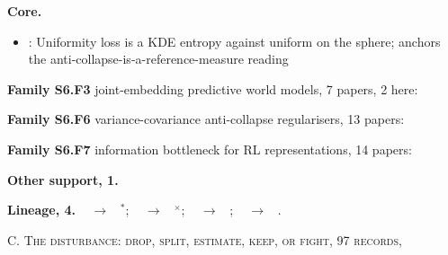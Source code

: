 \documentclass[10pt]{article}
\newcommand{\memb}[1]{\par\smallskip\textbf{#1}\quad}
\begin{document}
\memb{Core.}
\begin{itemize}[nosep,leftmargin=1.2em]
\item \citet{Wang-understanding20}: Uniformity loss is a KDE entropy against uniform on the sphere; anchors the anti-collapse-is-a-reference-measure reading
\end{itemize}
\memb{Family S6.F3} joint-embedding predictive world models, 7 papers, 2 here: {\footnotesize \citetext{\citealp{Balestriero-lejepa25}; \citealp{Karmann-motionjepa26}}}

\memb{Family S6.F6} variance-covariance anti-collapse regularisers, 13 papers: {\footnotesize \citetext{\citealp{Wang-understanding20}; \citealp{Pasand-stable26}; \citealp{Ermolov-whitening20}; \citealp{Bardes-vicreg21}; \citealp{Jing-understanding21}; \citealp{Zbontar-barlow21}; \citealp{Balestriero-contrastive22}; \citealp{Garrido-duality22}; \citealp{Garrido-rankme22}; \citealp{Lavoie-simplicial22}; \citealp{Li-selfsupervised22b}; \citealp{Shwartz-Ziv-compress23}; \citealp{Shwartz-Ziv-informationtheoretic23}}}

\memb{Family S6.F7} information bottleneck for RL representations, 14 papers: {\footnotesize \citetext{\citealp{Achille-separation18}; \citealp{Igl-generalization19}; \citealp{Lu-dynamics20}; \citealp{Tomar-ignorance23}; \citealp{Achille-emergence17}; \citealp{Alemi-deep17}; \citealp{Achille-information18}; \citealp{Federici-learning20}; \citealp{Fischer-conditional20}; \citealp{Pacelli-learning20}; \citealp{Bai-dynamic21}; \citealp{Fan-robust21}; \citealp{Islam-representation22}; \citealp{Zhu-repo23}}}

\memb{Other support, 1.} \citetext{\citealp{FrancoisLavet-combined19}}

\memb{Lineage, 4.} {\footnotesize \citeauthor{FrancoisLavet-combined19}~\citeyear{FrancoisLavet-combined19} $\to$ \citeauthor{Wang-understanding20}~\citeyear{Wang-understanding20}$^\ast$; \citeauthor{Goyal-infobot19}~\citeyear{Goyal-infobot19} $\to$ \citeauthor{Igl-generalization19}~\citeyear{Igl-generalization19}$^\times$; \citeauthor{Igl-generalization19}~\citeyear{Igl-generalization19} $\to$ \citeauthor{Lu-dynamics20}~\citeyear{Lu-dynamics20}; \citeauthor{Balestriero-lejepa25}~\citeyear{Balestriero-lejepa25} $\to$ \citeauthor{Maes-leworldmodel26}~\citeyear{Maes-leworldmodel26}.}

\medskip\textsc{C. The disturbance: drop, split, estimate, keep, or fight, 97 records,}
\end{document}
